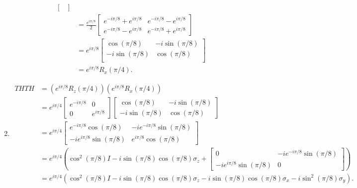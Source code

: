 \documentclass{article}
\begin{document}
\begin{enumerate}[label=(\alph*)]
\begin{align*}
\begin{bmatrix}
                \end{bmatrix} \\
                &= \frac{e^{i\pi/8}}{2} \begin{bmatrix}
                    e^{-i\pi/8}+e^{i\pi/8} & e^{-i\pi/8}-e^{i\pi/8} \\
                    e^{-i\pi/8}-e^{i\pi/8} & e^{-i\pi/8}+e^{i\pi/8}
                \end{bmatrix} \\
                &= e^{i\pi/8} \begin{bmatrix}
                    \cos(\pi/8) & -i\sin(\pi/8) \\
                    -i\sin(\pi/8) & \cos(\pi/8) \\
                \end{bmatrix} \\
                &= e^{i\pi/8} R_x(\pi/4).
    \end{align*}
\item \begin{align*}
        THTH &= \left( e^{i\pi/8} R_z(\pi/4) \right) \left( e^{i\pi/8} R_x(\pi/4) \right) \\
             &= e^{i\pi/4} \begin{bmatrix}
                 e^{-i\pi/8} & 0 \\
                 0 & e^{i\pi/8}
             \end{bmatrix} \begin{bmatrix}
                 \cos(\pi/8) & -i\sin(\pi/8) \\
                 -i\sin(\pi/8) & \cos(\pi/8)
             \end{bmatrix} \\
             &= e^{i\pi/4} \begin{bmatrix}
                 e^{-i\pi/8}\cos(\pi/8) & -ie^{-i\pi/8}\sin(\pi/8) \\
                 -ie^{i\pi/8}\sin(\pi/8) & e^{i\pi/8}\cos(\pi/8)
             \end{bmatrix} \\
             &= e^{i\pi/4} \left( \cos^2(\pi/8) I - i \sin(\pi/8)\cos(\pi/8) \sigma_z +  \begin{bmatrix}
                 0 & -ie^{-i\pi/8}\sin(\pi/8) \\
                 -ie^{i\pi/8}\sin(\pi/8) & 0
         \end{bmatrix} \right) \\
             &= e^{i\pi/4} \left( \cos^2(\pi/8) I - i \sin(\pi/8)\cos(\pi/8) \sigma_z - i\sin(\pi/8)\cos(\pi/8) \sigma_x - i \sin^2(\pi/8)\sigma_y \right).

\end{align*}
\end{enumerate}
\end{document}
